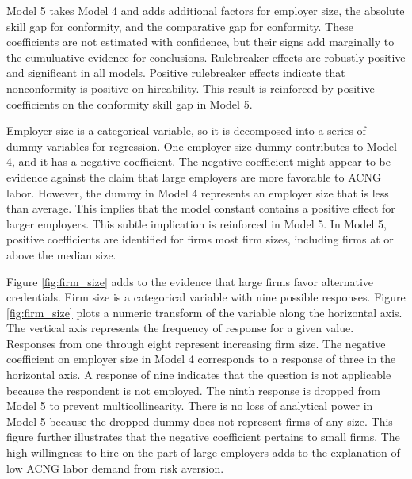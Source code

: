 \documentclass[review]{elsarticle}
\begin{document}
Model 5 takes Model 4 and adds additional factors for employer size,
the absolute skill gap for conformity, and the comparative gap for conformity.
These coefficients are not estimated with confidence, but their signs add marginally to the cumuluative evidence for conclusions.
Rulebreaker effects are robustly positive and significant in all models.
Positive rulebreaker effects indicate that nonconformity is positive on hireability.
This result is reinforced by positive coefficients on the conformity skill gap in Model 5.

Employer size is a categorical variable, so it is decomposed into a series of dummy variables for regression.
One employer size dummy contributes to Model 4, and it has a negative coefficient.
The negative coefficient might appear to be evidence against the claim that large employers
are more favorable to ACNG labor.
However, the dummy in Model 4 represents an employer size that is less than average.
This implies that the model constant contains a positive effect for larger employers.
This subtle implication is reinforced in Model 5.
In Model 5, positive coefficients are identified for firms most firm sizes,
including firms at or above the median size.

Figure \ref{fig:firm_size} adds to the evidence that large firms favor alternative credentials.
Firm size is a categorical variable with nine possible responses.
Figure \ref{fig:firm_size} plots a numeric transform of the variable along the horizontal axis.
The vertical axis represents the frequency of response for a given value.
Responses from one through eight represent increasing firm size.
The negative coefficient on employer size in Model 4 corresponds to a response of three in the horizontal axis.
A response of nine indicates that the question is not applicable because the respondent is not employed.
The ninth response is dropped from Model 5 to prevent multicollinearity.
There is no loss of analytical power in Model 5 because the dropped dummy does not represent firms of any size.
This figure further illustrates that the negative coefficient pertains to small firms.
The high willingness to hire on the part of large employers adds to the explanation of low ACNG labor demand from risk aversion.
\end{document}
